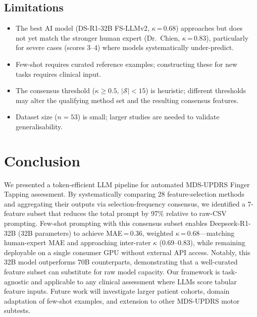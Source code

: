 \documentclass[conference]{IEEEtran}
\begin{document}
\subsection{Limitations}
\begin{itemize}
    \item The best AI model (DS-R1-32B FS-LLMv2, $\kappa$\,=\,0.68) approaches but
          does not yet match the stronger human expert (Dr.\ Chien, $\kappa$\,=\,0.83),
          particularly for severe cases (scores 3--4) where models systematically
          under-predict.
    \item Few-shot requires curated reference examples; constructing these for new tasks
          requires clinical input.
    \item The consensus threshold ($\kappa \geq 0.5$, $|\mathcal{S}| < 15$) is heuristic;
          different thresholds may alter the qualifying method set and the resulting
          consensus features.
    \item Dataset size ($n = 53$) is small; larger studies are needed to validate
          generalisability.
\end{itemize}

\section{Conclusion}

We presented a token-efficient LLM pipeline for automated MDS-UPDRS Finger Tapping
assessment. By systematically comparing 28 feature-selection methods and aggregating
their outputs via selection-frequency consensus, we identified a 7-feature subset that
reduces the total prompt by 97\% relative to raw-CSV prompting. Few-shot prompting with
this consensus subset enables Deepseek-R1-32B (32B parameters) to achieve MAE\,=\,0.36,
weighted $\kappa$\,=\,0.68---matching human-expert MAE and approaching inter-rater
$\kappa$ (0.69--0.83), while remaining deployable on a single consumer GPU without
external API access. Notably, this 32B model outperforms 70B counterparts, demonstrating
that a well-curated feature subset can substitute for raw model capacity. Our framework is task-agnostic and
applicable to any clinical assessment where LLMs score tabular feature inputs. Future work
will investigate larger patient cohorts, domain adaptation of few-shot examples, and
extension to other MDS-UPDRS motor subtests.

\end{document}
